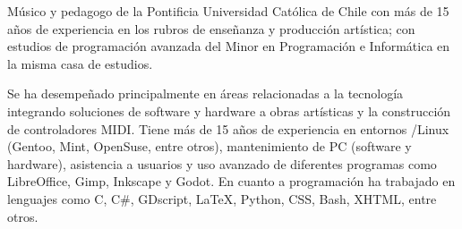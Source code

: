 

\begin{cvparagraph}

Músico y pedagogo de la Pontificia Universidad Católica de Chile con más de 15
años de experiencia en los rubros de enseñanza y producción artística; con
estudios de programación avanzada del Minor en Programación e Informática en la
misma casa de estudios.

Se ha desempeñado principalmente en áreas relacionadas a la tecnología
integrando soluciones de software y hardware a obras artísticas y la
construcción de controladores MIDI. Tiene más de 15 años de experiencia en
entornos /Linux (Gentoo, Mint, OpenSuse, entre otros), mantenimiento
de PC (software y hardware), asistencia a usuarios y uso avanzado de diferentes
programas como LibreOffice, Gimp, Inkscape y Godot. En cuanto a programación ha
trabajado en lenguajes como C, C\#, GDscript, LaTeX, Python, CSS, Bash, XHTML,
entre otros.

\end{cvparagraph}

